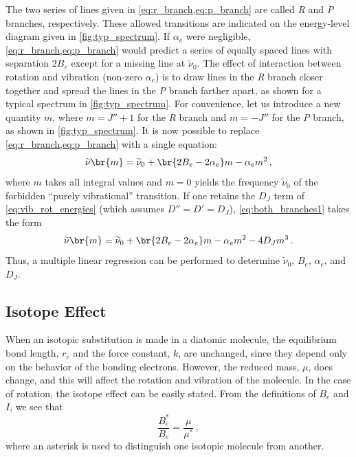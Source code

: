 \documentclass[nobib,nofonts,nols,nohyper]{tufte-handout}
\begin{document}
The two series of lines given in \cref{eq:r_branch,eq:p_branch} are called \emph{R} and \emph{P} branches, respectively. 
These allowed transitions are indicated on the energy-level diagram given in \cref{fig:typ_spectrum}. 
If \( \alpha_e \) were negligible, \cref{eq:r_branch,eq:p_branch} would predict a series of equally spaced lines with separation \( 2 B_e \) except for a missing line at \( \widetilde{\nu}_0 \). 
The effect of interaction between rotation and vibration (non-zero \( \alpha_e \)) is to draw lines in the \emph{R} branch closer together and spread the lines in the \emph{P} branch farther apart, as shown for a typical spectrum in \cref{fig:typ_spectrum}. 
For convenience, let us introduce a new quantity \( m \), where \( m = J'' + 1 \) for the \emph{R} branch and \( m = -J'' \) for the \emph{P} branch, as shown in \cref{fig:typ_spectrum}. 
It is now possible to replace \cref{eq:r_branch,eq:p_branch} with a single equation:
\begin{equation}
	\widetilde{\nu}\br{m} = \widetilde{\nu}_0 + \br{2 B_e - 2 \alpha_e} m - \alpha_e m^2 \, ,
	\label{eq:both_branches1}
\end{equation}
where \( m \) takes all integral values and \( m = 0 \) yields the frequency \( \widetilde{\nu}_0 \) of the forbidden ``purely vibrational'' transition. 
If one retains the \( D_J \) term of \cref{eq:vib_rot_energies} (which assumes \( D'' = D' = D_J \)), \cref{eq:both_branches1} takes the form
\begin{equation}
	\widetilde{\nu}\br{m} = \widetilde{\nu}_0 + \br{2 B_e - 2 \alpha_e} m - \alpha_e m^2 - 4 D_J m^3 \, .
	\label{eq:both_branches2}
\end{equation}
Thus, a multiple linear regression can be performed to determine \( \widetilde{\nu}_0 \), \( B_e \), \( \alpha_e \), and \( D_J \).


\subsection{Isotope Effect} %
\label{sub:isotope_effect}

When an isotopic substitution is made in a diatomic molecule, the equilibrium bond length, \( r_e \) and the force constant, \( k \), are unchanged, since they depend only on the behavior of the bonding electrons. 
However, the reduced mass, \( \mu \), does change, and this will affect the rotation and vibration of the molecule. 
In the case of rotation, the isotope effect can be easily stated. From the definitions of \( B_e \) and \( I \), we see that 
\begin{equation}
	\frac{B_e^*}{B_e} = \frac{\mu}{\mu^*} \, ,
	\label{eq:eff_mass_isotope_relation}
\end{equation}
where an asterisk is used to distinguish one isotopic molecule from another. 
\end{document}
